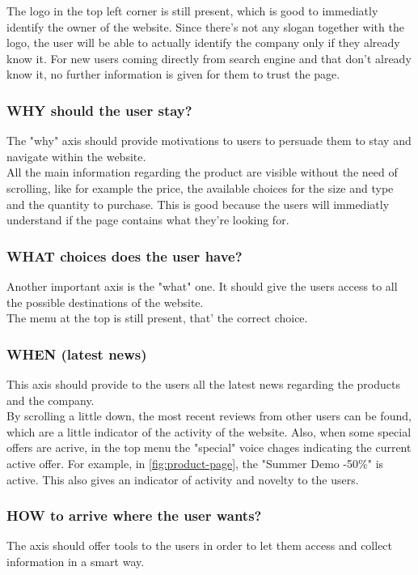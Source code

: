The logo in the top left corner is still present, which is good to immediatly identify the owner of the website.
Since there's not any slogan together with the logo, the user will be able to actually identify the company only
if they already know it. For new users coming directly from search engine and that don't already know it, no
further information is given for them to trust the page.


\subsubsection{WHY should the user stay?} 
The "why" axis should provide motivations to users to persuade them to stay and navigate within the website.\\

All the main information regarding the product are visible without the need
of scrolling, like for example the price, the available choices for the size
and type and the quantity to purchase. This is good because the users will immediatly understand if 
the page contains what they're looking for.


\subsubsection{WHAT choices does the user have?} 
Another important axis is the "what" one. It should give the users access to all the possible destinations of the website.\\

The menu at the top is still present, that' the correct choice.

\subsubsection{WHEN (latest news)} 
This axis should provide to the users all the latest news regarding the products and the company.\\

By scrolling a little down, the most recent reviews from other users can be found, which are a little
indicator of the activity of the website. Also, when some special offers are acrive, in the top menu
the "special" voice chages indicating the current active offer. For example, in \cref{fig:product-page}, 
the "Summer Demo -50\%" is active. This also gives an indicator of activity and novelty to the users.

\subsubsection{HOW to arrive where the user wants?} 
The axis should offer tools to the users in order to let them access and collect information in a smart way.\\

